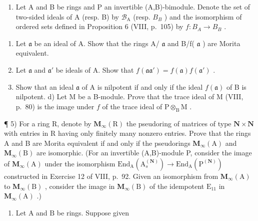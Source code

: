 \begin{enumerate}
\def\labelenumi{\arabic{enumi})}
\setcounter{enumi}{3}
\tightlist
\item
  Let A and B be rings and P an invertible (A,B)-bimodule. Denote the set of two-sided ideals of A (resp. B) by \(\mathcal{B}_{\mathrm{A}}\) (resp. \(B_{B}\) ) and the isomorphism of ordered sets defined in Proposition 6 (VIII, p.~105) by \(f: B_{A} \to B_{B}\) .
\end{enumerate}

\begin{enumerate}
\def\labelenumi{\alph{enumi})}
\item
  Let \(\mathfrak{a}\) be an ideal of A. Show that the rings A/ \(\mathfrak{a}\) and B/f( \(\mathfrak{a}\) ) are Morita equivalent.
\item
  Let \(\mathfrak{a}\) and \(\mathfrak{a}'\) be ideals of A. Show that \(f(\mathfrak{aa}') = f(\mathfrak{a})f(\mathfrak{a}')\) .
\item
  Show that an ideal \(\mathfrak{a}\) of A is nilpotent if and only if the ideal \(f(\mathfrak{a})\) of B is nilpotent. d) Let M be a B-module. Prove that the trace ideal of M (VIII, p.~80) is the image under \(f\) of the trace ideal of \(\mathrm{P} \otimes_{\mathrm{B}} \mathrm{M}\) .
\end{enumerate}

¶ 5) For a ring R, denote by \(\mathbf{M}_{\infty}(\mathrm{R})\) the pseudoring of matrices of type \(\mathbf{N} \times \mathbf{N}\) with entries in R having only finitely many nonzero entries. Prove that the rings A and B are Morita equivalent if and only if the pseudorings \(\mathbf{M}_{\infty}(\mathrm{A})\) and \(\mathbf{M}_{\infty}(\mathrm{B})\) are isomorphic. (For an invertible (A,B)-module P, consider the image of \(\mathbf{M}_{\infty}(\mathrm{A})\) under the isomorphism \(\mathrm{End}_{\mathrm{A}}(\mathrm{A}_{s}^{(\mathbf{N})}) \to \mathrm{End}_{\mathrm{A}}(\mathrm{P}^{(\mathbf{N})})\) constructed in Exercise 12 of VIII, p.~92. Given an isomorphism from \(\mathbf{M}_{\infty}(\mathrm{A})\) to \(\mathbf{M}_{\infty}(\mathrm{B})\) , consider the image in \(\mathbf{M}_{\infty}(\mathrm{B})\) of the idempotent \(\mathrm{E}_{11}\) in \(\mathbf{M}_{\infty}(\mathrm{A})\) .)

\begin{enumerate}
\def\labelenumi{\arabic{enumi})}
\setcounter{enumi}{5}
\tightlist
\item
  Let \(\mathrm{A}\) and \(\mathrm{B}\) be rings. Suppose given
\end{enumerate}


